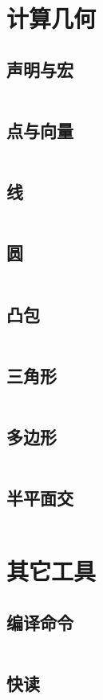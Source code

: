 \documentclass[10pt, a4paper, oneside]{ctexart}
\begin{document}
\begin{multicols}{2}
        \section{计算几何}
        \subsection{声明与宏}
        \inputminted{cpp}{src/geometry/define.cpp}
        \subsection{点与向量}
        \inputminted{cpp}{src/geometry/vector.cpp}
        \subsection{线}
        \inputminted{cpp}{src/geometry/line.cpp}
        \subsection{圆}
        \inputminted{cpp}{src/geometry/circle.cpp}
        \subsection{凸包}
        \inputminted{cpp}{src/geometry/convex.cpp}
        \subsection{三角形}
        \inputminted{cpp}{src/geometry/triangle.cpp}
        \subsection{多边形}
        \inputminted{cpp}{src/geometry/polygon.cpp}
        \subsection{半平面交}
        \inputminted{cpp}{src/geometry/half-plane.cpp}
        \newpage

        \section{其它工具}
        \subsection{编译命令}
        \inputminted{bash}{src/tools/compile.sh}
        \subsection{快读}
        \inputminted{cpp}{src/tools/fastio.cpp}

\end{multicols}
\end{document}
